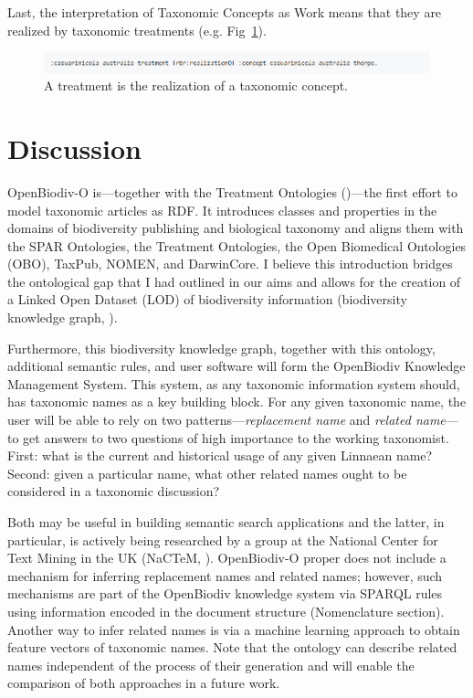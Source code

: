 Last, the interpretation of Taxonomic Concepts as Work means that they are realized by taxonomic treatments (e.g. Fig~\ref{example-treatment-concept}).

\begin{figure}[h!]
\centering
  \includegraphics[width=\textwidth]{Figures/example-treatment-concept}
  \decoRule
  \caption[Example connection between a treatment and a taxonomic concept.]{A treatment is the realization of a taxonomic concept.}
  \label{example-treatment-concept}
\end{figure}

\section{Discussion}

OpenBiodiv-O is---together with the Treatment Ontologies (\cite{catapano_treatment_2016})---the first effort to model taxonomic articles as RDF. It introduces classes and properties in the domains of biodiversity publishing and biological taxonomy and aligns them with the SPAR Ontologies, the Treatment Ontologies, the Open Biomedical Ontologies (OBO), TaxPub, NOMEN, and DarwinCore. I believe this introduction bridges the ontological gap that I had outlined in our aims and allows for the creation of a Linked Open Dataset (LOD) of biodiversity information (biodiversity knowledge graph, \cite{senderov_open_2016, page_towards_2016}).

Furthermore, this biodiversity knowledge graph, together with this ontology, additional semantic rules, and user software will form the OpenBiodiv Knowledge Management System. This system, as any taxonomic information system should, has taxonomic names as a key building block. For any given taxonomic name, the user will be able to rely on two patterns---\emph{replacement name} and \emph{related name}---to get answers to two questions of high importance to the working taxonomist. First: what is the current and historical usage of any given Linnaean name? Second: given a particular name, what other related names ought to be considered in a taxonomic discussion?

Both may be useful in building semantic search applications and the latter, in particular, is actively being researched by a group at the National Center for Text Mining in the UK (NaCTeM, \cite{nguyen_constructing_2017}). \mbox{OpenBiodiv-O} proper does not include a mechanism for inferring replacement names and related names; however, such mechanisms are part of the OpenBiodiv knowledge system via SPARQL rules using information encoded in the document structure (Nomenclature section). Another way to infer related names is via a machine learning approach to obtain feature vectors of taxonomic names.  Note that the ontology can describe related names independent of the process of their generation and will enable the comparison of both approaches in a future work.

